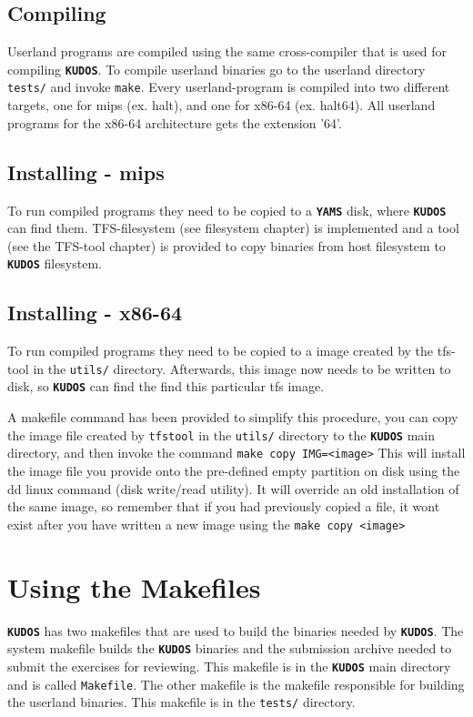 \documentclass[twoside,a4paper]{report}
\newcommand{\kudos}{\texttt{\textbf{KUDOS}}}
\newcommand{\yams}{\texttt{\textbf{YAMS}}}
\begin{document}
\subsection{Compiling}
Userland programs are compiled using the same cross-compiler that is
used for compiling \kudos{}. To compile userland binaries go to
the userland directory \texttt{tests/} and invoke \texttt{make}.
Every userland-program is compiled into two different targets, one
for mips (ex. halt), and one for x86-64 (ex. halt64). All userland programs
for the x86-64 architecture gets the extension '64'.

\subsection{Installing - mips}
To run compiled programs they need to be
copied to a \yams{} disk, where \kudos{} can find
them. TFS-filesystem (see filesystem chapter) is implemented and a tool
(see the TFS-tool chapter) is provided to copy binaries from host
filesystem to \kudos{} filesystem. 

\subsection{Installing - x86-64}
To run compiled programs they need to be
copied to a image created by the tfs-tool in the \texttt{utils/} directory.
Afterwards, this image now needs to be written to disk, so \kudos{} can
find the find this particular tfs image.

A makefile command has been provided to simplify this procedure, you can
copy the image file created by \texttt{tfstool} in the \texttt{utils/} directory
to the \kudos{} main directory, and then invoke the command \texttt{make copy IMG=<image>}
This will install the image file you provide onto the pre-defined empty partition on disk using the
dd linux command (disk write/read utility). It will override an old installation of the same image, so
remember that if you had previously copied a file, it wont exist after you have written a new image
using the \texttt{make copy <image>}

\section{Using the Makefiles}
\label{sec:makefiles}

\kudos{} has two makefiles that are used to build the binaries needed
by \kudos{}. The system makefile builds the \kudos{} binaries and the
submission archive needed to submit the exercises for reviewing. This
makefile is in the \kudos{} main directory and is called
\texttt{Makefile}. The other makefile is the makefile responsible for
building the userland binaries. This makefile is in the
\texttt{tests/} directory.
\end{document}
